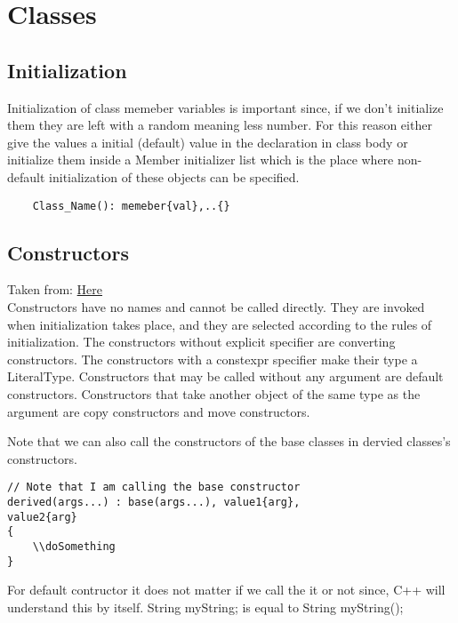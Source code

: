 \documentclass[11pt,twoside,a4paper]{report}
\begin{document}
\chapter{Classes}
\section{Initialization}
Initialization of class memeber variables is important since, if we don't initialize them they are left with a random meaning less number. For this reason either give the values a initial (default) value in the declaration in class body
or initialize them inside a Member initializer list which is the place where non-default initialization of these objects can be specified.
\begin{lstlisting}
    Class_Name(): memeber{val},..{}
\end{lstlisting}
\section{Constructors}
Taken from: \href{https://en.cppreference.com/w/cpp/language/constructor}{Here} \\
Constructors have no names and cannot be called directly. They are invoked when initialization takes place, and they are selected according to 
the rules of initialization. The constructors without explicit specifier are converting constructors. The constructors with a constexpr specifier 
make their type a LiteralType. Constructors that may be called without any argument are default constructors. Constructors that take another object of the same type as the argument are copy constructors and move constructors. 

Note that we can also call the constructors of the base classes in dervied classes's constructors.

\begin{lstlisting}
// Note that I am calling the base constructor
derived(args...) : base(args...), value1{arg}, 
value2{arg}
{
    \\doSomething
}
\end{lstlisting}

For default contructor it does not matter if we call the it or not since, C++ will understand this by itself.
String myString; is equal to String myString();
\end{document}
